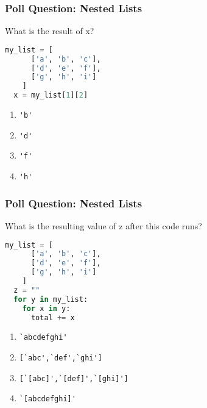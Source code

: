 \documentclass{beamer}
\begin{document}
%
%
\begin{frame}[fragile]
  \frametitle{Poll Question: Nested Lists}
  What is the result of x?
  \begin{lstlisting}[language=Python, autogobble]
  my_list = [
      ['a', 'b', 'c'],
      ['d', 'e', 'f'],
      ['g', 'h', 'i']
    ]
  x = my_list[1][2]
  \end{lstlisting}
  \vfill
  \begin{enumerate}[A]
    \item \lstinline|'b'|
    \item \lstinline|'d'|
    \item \lstinline|'f'|
    \item \lstinline|'h'|
  \end{enumerate}
\end{frame}

%
%
\begin{frame}[fragile]
  \frametitle{Poll Question: Nested Lists}
  What is the resulting value of z after this code runs?
  \begin{lstlisting}[language=Python, autogobble]
  my_list = [
      ['a', 'b', 'c'],
      ['d', 'e', 'f'],
      ['g', 'h', 'i']
    ]
  z = ""
  for y in my_list:
    for x in y:
      total += x
  \end{lstlisting}
  \vfill
  \begin{enumerate}[A]
    \item \lstinline|`abcdefghi'|
    \item \lstinline|[`abc',`def',`ghi']|
    \item \lstinline|[`[abc]',`[def]',`[ghi]']|
    \item \lstinline|`[abcdefghi]'|
  \end{enumerate}
\end{frame}
\end{document}
